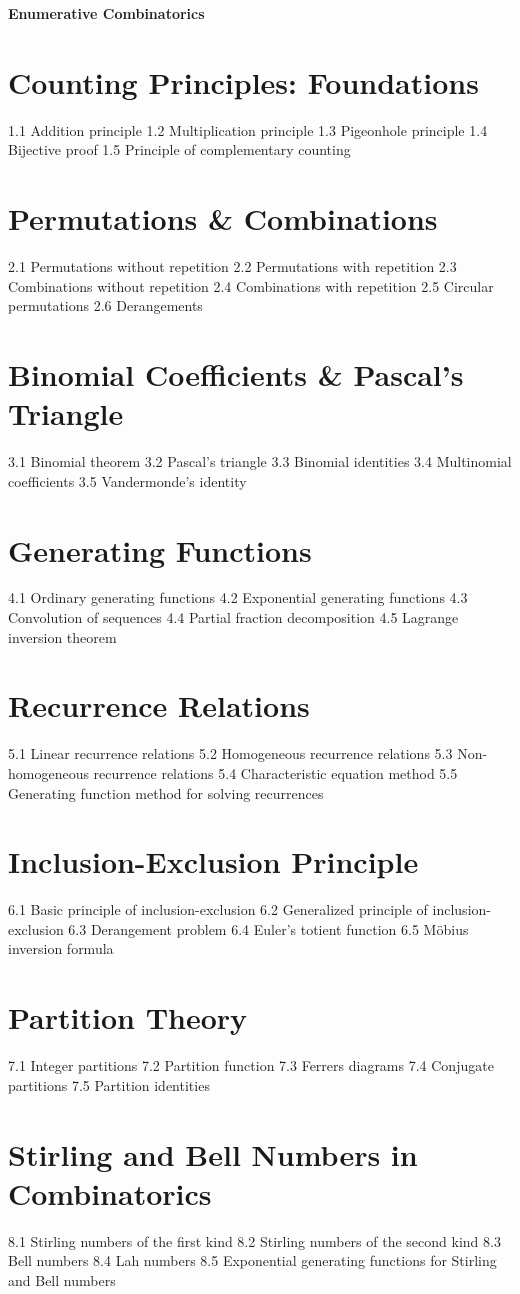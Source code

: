 {\LARGE \bf{Enumerative Combinatorics}}
\section{Counting Principles: Foundations}
1.1 Addition principle
1.2 Multiplication principle
1.3 Pigeonhole principle
1.4 Bijective proof
1.5 Principle of complementary counting
\section{Permutations \& Combinations}
2.1 Permutations without repetition
2.2 Permutations with repetition
2.3 Combinations without repetition
2.4 Combinations with repetition
2.5 Circular permutations
2.6 Derangements
\section{Binomial Coefficients \& Pascal's Triangle}
3.1 Binomial theorem
3.2 Pascal's triangle
3.3 Binomial identities
3.4 Multinomial coefficients
3.5 Vandermonde's identity
\section{Generating Functions}
4.1 Ordinary generating functions
4.2 Exponential generating functions
4.3 Convolution of sequences
4.4 Partial fraction decomposition
4.5 Lagrange inversion theorem
\section{Recurrence Relations}
5.1 Linear recurrence relations
5.2 Homogeneous recurrence relations
5.3 Non-homogeneous recurrence relations
5.4 Characteristic equation method
5.5 Generating function method for solving recurrences
\section{Inclusion-Exclusion Principle}
6.1 Basic principle of inclusion-exclusion
6.2 Generalized principle of inclusion-exclusion
6.3 Derangement problem
6.4 Euler's totient function
6.5 Möbius inversion formula
\section{Partition Theory}
7.1 Integer partitions
7.2 Partition function
7.3 Ferrers diagrams
7.4 Conjugate partitions
7.5 Partition identities
\section{Stirling and Bell Numbers in Combinatorics}
8.1 Stirling numbers of the first kind
8.2 Stirling numbers of the second kind
8.3 Bell numbers
8.4 Lah numbers
8.5 Exponential generating functions for Stirling and Bell numbers
